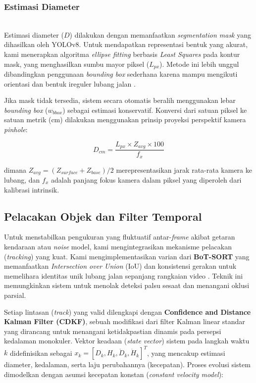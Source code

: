 \documentclass{iopjournal}
\begin{document}
\subsubsection{Estimasi Diameter}
\mbox{}\\
Estimasi diameter ($D$) dilakukan dengan memanfaatkan \textit{segmentation mask} yang dihasilkan oleh YOLOv8. Untuk mendapatkan representasi bentuk yang akurat, kami menerapkan algoritma \textit{ellipse fitting} berbasis \textit{Least Squares} pada kontur mask, yang menghasilkan sumbu mayor piksel ($L_{px}$). Metode ini lebih unggul dibandingkan penggunaan \textit{bounding box} sederhana karena mampu mengikuti orientasi dan bentuk ireguler lubang jalan \cite{singh2021}.

Jika mask tidak tersedia, sistem secara otomatis beralih menggunakan lebar \textit{bounding box} ($w_{bbox}$) sebagai estimasi konservatif. Konversi dari satuan piksel ke satuan metrik (cm) dilakukan menggunakan prinsip proyeksi perspektif kamera \textit{pinhole}:

\begin{equation}
D_{cm} = \frac{L_{px} \times Z_{avg} \times 100}{f_x}
\end{equation}

dimana $Z_{avg} = (Z_{surface} + Z_{base}) / 2$ merepresentasikan jarak rata-rata kamera ke lubang, dan $f_x$ adalah panjang fokus kamera dalam piksel yang diperoleh dari kalibrasi intrinsik.


\subsection{Pelacakan Objek dan Filter Temporal}
Untuk menstabilkan pengukuran yang fluktuatif antar-\textit{frame} akibat getaran kendaraan atau \textit{noise} model, kami mengintegrasikan mekanisme pelacakan (\textit{tracking}) yang kuat. Kami mengimplementasikan varian dari \textbf{BoT-SORT} yang memanfaatkan \textit{Intersection over Union} (IoU) dan konsistensi gerakan untuk memelihara identitas unik lubang jalan sepanjang rangkaian video \cite{aharon2022}. Teknik ini memungkinkan sistem untuk menolak deteksi palsu sesaat dan menangani oklusi parsial.

Setiap lintasan (\textit{track}) yang valid dilengkapi dengan \textbf{Confidence and Distance Kalman Filter (CDKF)}, sebuah modifikasi dari filter Kalman linear standar yang dirancang untuk menangani ketidakpastian dinamis pada persepsi kedalaman monokuler. Vektor keadaan (\textit{state vector}) sistem pada langkah waktu $k$ didefinisikan sebagai $x_k = [D_k, H_k, \dot{D}_k, \dot{H}_k]^T$, yang mencakup estimasi diameter, kedalaman, serta laju perubahannya (kecepatan). Proses evolusi sistem dimodelkan dengan asumsi kecepatan konstan (\textit{constant velocity model}):
\end{document}
